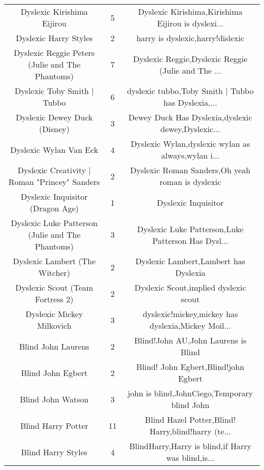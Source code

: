 \begin{table}[h!]
{\begin{tabular}{|c|c|c|}
                        Dyslexic Kirishima Eijirou &      5 & Dyslexic Kirishima,Kirishima Eijirou is dyslexi... \\
                             Dyslexic Harry Styles &      2 &                   harry is dyslexic,harry!dislexic \\
   Dyslexic Reggie Peters (Julie and The Phantoms) &      7 & Dyslexic Reggie,Dyslexic Reggie (Julie and The ... \\
                       Dyslexic Toby Smith | Tubbo &      6 & dyslexic tubbo,Toby Smith | Tubbo has Dyslexia,... \\
                      Dyslexic Dewey Duck (Disney) &      3 & Dewey Duck Has Dyslexia,dyslexic dewey,Dyslexic... \\
                            Dyslexic Wylan Van Eck &      4 & Dyslexic Wylan,dyslexic wylan as always,wylan i... \\
     Dyslexic Creativity | Roman "Princey" Sanders &      2 &   Dyslexic Roman Sanders,Oh yeah roman is dyslexic \\
                  Dyslexic Inquisitor (Dragon Age) &      1 &                                Dyslexic Inquisitor \\
  Dyslexic Luke Patterson (Julie and The Phantoms) &      3 & Dyslexic Luke Patterson,Luke Patterson Has Dysl... \\
                    Dyslexic Lambert (The Witcher) &      2 &              Dyslexic Lambert,Lambert has Dyslexia \\
                  Dyslexic Scout (Team Fortress 2) &      2 &              Dyslexic Scout,implied dyslexic scout \\
                         Dyslexic Mickey Milkovich &      3 & dyslexic!mickey,mickey has dyslexia,Mickey Moil... \\
                                Blind John Laurens &      2 &                Blind!John AU,John Laurens is Blind \\
                                 Blind John Egbert &      2 &               Blind! John Egbert,Blind!john Egbert \\
                                 Blind John Watson &      3 &       john is blind,JohnCiego,Temporary blind John \\
                                Blind Harry Potter &     11 & Blind Hazel Potter,Blind! Harry,blind!harry (te... \\
                                Blind Harry Styles &      4 & BlindHarry,Harry is blind,if Harry was blind,is... \\

\end{tabular}}
\end{table}
